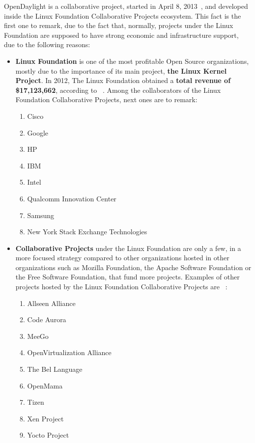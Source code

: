 \documentclass[a4paper, 12pt]{book}
\begin{document}
OpenDaylight is a collaborative project, started in April 8, 2013~\cite{OpenDaylightAnnouncement}, and developed inside the Linux Foundation Collaborative Projects ecosystem. This fact is the first one to remark, due to the fact that, normally, projects under the Linux Foundation are supposed to have strong economic and infrastructure support, due to the following reasons:
\begin{itemize}
 \item \textbf{Linux Foundation} is one of the most profitable Open Source organizations, mostly due to the importance of its main project, \textbf{the Linux Kernel Project}. In 2012, The Linux Foundation obtained a \textbf{total revenue of \$17,123,662}, according to ~\cite{2012LinuxFoundationReport}. Among the collaborators of the Linux Foundation Collaborative Projects, next ones are to remark: ~\cite{LinuxFoundationCollaborativeProjects}
 \begin{enumerate}\itemsep0pt
  \item Cisco
  \item Google
  \item HP
  \item IBM
  \item Intel
  \item Qualcomm Innovation Center
  \item Samsung
  \item New York Stack Exchange Technologies
 \end{enumerate}
 \item \textbf{Collaborative Projects} under the Linux Foundation are only a few, in a more focused strategy compared to other organizations hosted in other organizations such as Mozilla Foundation, the Apache Software Foundation or the Free Software Foundation, that fund more projects. Examples of other projects hosted by the Linux Foundation Collaborative Projects are ~\cite{LinuxFoundationCollaborativeProjects}:
 \begin{enumerate}\itemsep0pt
  \item Allseen Alliance
  \item Code Aurora
  \item MeeGo
  \item OpenVirtualization Alliance
  \item The Bel Language
  \item OpenMama
  \item Tizen
  \item Xen Project
  \item Yocto Project
 \end{enumerate}
\end{itemize}
\end{document}
